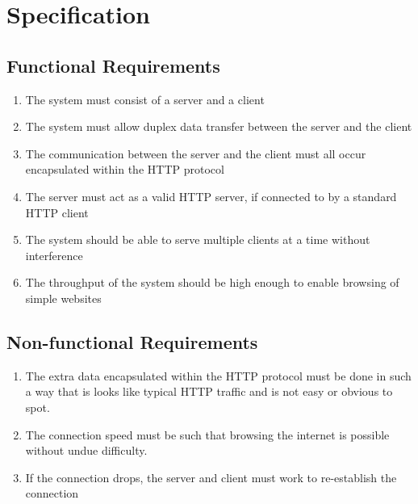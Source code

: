 \section{Specification}
\subsection{Functional Requirements}
\begin{enumerate}
    \item The system must consist of a server and a client
    \item The system must allow duplex data transfer between the server and the client
    \item The communication between the server and the client must all occur encapsulated within the HTTP protocol
    \item The server must act as a valid HTTP server, if connected to by a standard HTTP client
    \item The system should be able to serve multiple clients at a time without interference
    \item The throughput of the system should be high enough to enable browsing of simple websites
\end{enumerate}
\subsection{Non-functional Requirements}
\begin{enumerate}
    \item The extra data encapsulated within the HTTP protocol must be done in such a way that is looks like typical HTTP traffic and is not easy or obvious to spot.
    \item The connection speed must be such that browsing the internet is possible without undue difficulty.
    \item If the connection drops, the server and client must work to re-establish the connection
\end{enumerate}


